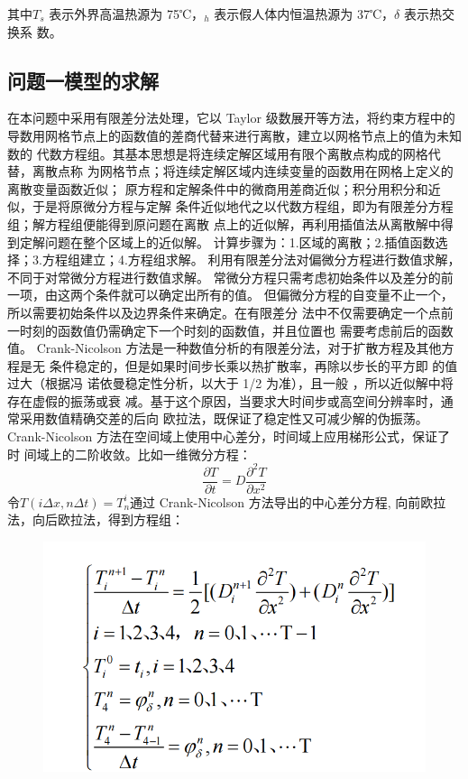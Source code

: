 \documentclass{article}
\begin{document}
	其中$T_{s}$ 表示外界高温热源为 75℃，$_{h}$ 表示假人体内恒温热源为 37℃，$\delta$  表示热交换系
	数。
	\subsection{问题一模型的求解}
	在本问题中采用有限差分法处理，它以 Taylor 级数展开等方法，将约束方程中的
	导数用网格节点上的函数值的差商代替来进行离散，建立以网格节点上的值为未知数的
	代数方程组。其基本思想是将连续定解区域用有限个离散点构成的网格代替，离散点称
	为网格节点；将连续定解区域内连续变量的函数用在网格上定义的离散变量函数近似；
	原方程和定解条件中的微商用差商近似；积分用积分和近似，于是将原微分方程与定解
	条件近似地代之以代数方程组，即为有限差分方程组；解方程组便能得到原问题在离散
	点上的近似解，再利用插值法从离散解中得到定解问题在整个区域上的近似解。
	计算步骤为：1.区域的离散；2.插值函数选择；3.方程组建立；4.方程组求解。
	利用有限差分法对偏微分方程进行数值求解，不同于对常微分方程进行数值求解。
	常微分方程只需考虑初始条件以及差分的前一项，由这两个条件就可以确定出所有的值。
	但偏微分方程的自变量不止一个，所以需要初始条件以及边界条件来确定。在有限差分
	法中不仅需要确定一个点前一时刻的函数值仍需确定下一个时刻的函数值，并且位置也
	需要考虑前后的函数值。 
	Crank-Nicolson 方法是一种数值分析的有限差分法，对于扩散方程及其他方程是无
	条件稳定的，但是如果时间步长乘以热扩散率，再除以步长的平方即 的值过大（根据冯
	诺依曼稳定性分析，以大于 1/2 为准），且一般 ，所以近似解中将存在虚假的振荡或衰
	减。基于这个原因，当要求大时间步或高空间分辨率时，通常采用数值精确交差的后向
	欧拉法，既保证了稳定性又可减少解的伪振荡。 
	Crank-Nicolson 方法在空间域上使用中心差分，时间域上应用梯形公式，保证了时
	间域上的二阶收敛。比如一维微分方程：$$\frac{\partial T}{\partial t} = D\frac{\partial ^{2} T}{\partial x^{2}}  $$
	令$T(i\varDelta x,n\varDelta t) = T^{i}_{n}$通过 Crank-Nicolson 方法导出的中心差分方程,
	向前欧拉法，向后欧拉法，得到方程组：
	
	\begin{figure}[htbp]
		\centering
		\includegraphics[scale=0.4]{屏幕截图 2024-07-15 222924.png}
	\end{figure}
	
\end{document}
